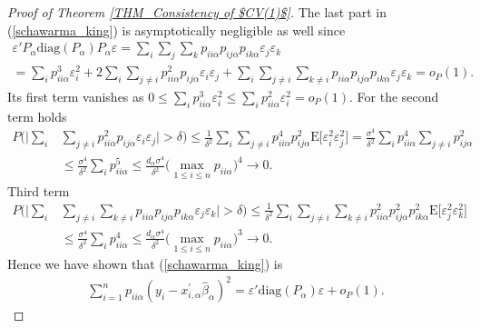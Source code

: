 \documentclass[Research_Module_ES.tex]{subfiles}
\begin{document}
\begin{proof}[Proof of Theorem \ref{THM_Consistency of $CV(1)$}]
	The last part in (\ref{schawarma_king}) is asymptotically negligible as well since
	\begin{align*}
	\varepsilon'P_\alpha\mathrm{diag}(P_\alpha)P_\alpha \varepsilon = \sum_i\sum_j\sum_k p_{ii\alpha}p_{ij\alpha}p_{ik\alpha}\varepsilon_j\varepsilon_k\\
	=\sum_i p_{ii\alpha}^3 \varepsilon_i^2 +2\sum_i\sum_{j\neq i}p_{ii\alpha}^2p_{ij\alpha}\varepsilon_i\varepsilon_j + 
	\sum_i\sum_{j\neq i}\sum_{k\neq i}p_{ii\alpha}p_{ij\alpha}p_{ik\alpha}\varepsilon_j\varepsilon_k=o_P(1).
	\end{align*}
	Its first term vanishes as $0\le \sum_i p_{ii\alpha}^3 \varepsilon_i^2 \le \sum_i p_{ii\alpha}^2 \varepsilon_i^2 = o_P(1)$.
	For the second term holds
	\begin{align*}
	P\biggl(\biggl|\sum_{i}&\sum_{j\neq i}p_{ii\alpha}^2p_{ij\alpha}\varepsilon_i\varepsilon_j\biggr|>\delta\biggr)\le\frac{1}{\delta^2}\sum_{i}\sum_{j\neq i}p_{ii\alpha}^4p_{ij\alpha}^2\mathrm{E}\bigl[\varepsilon_i^2\varepsilon_j^2\bigr]
	= \frac{\sigma^4}{\delta^2}\sum_{i}p_{ii\alpha}^4\sum_{j\neq i}p_{ij\alpha}^2\\
	&\le \frac{\sigma^4}{\delta^2}\sum_{i}p_{ii\alpha}^5 \le \frac{d_\alpha\sigma^4}{\delta^2}\biggl(\max_{1\le i\le n}p_{ii\alpha}\biggr)^4 \to 0.
	\end{align*}
	Third term
	\begin{align*}
	P\biggl(\biggl|\sum_i&\sum_{j\neq i}\sum_{k\neq i}p_{ii\alpha}p_{ij\alpha}p_{ik\alpha}\varepsilon_j\varepsilon_k\biggr|>\delta\biggr)\le\frac{1}{\delta^2}\sum_i\sum_{j\neq i}\sum_{k\neq i}p_{ii\alpha}^2p_{ij\alpha}^2p_{ik\alpha}^2\mathrm{E}\bigl[\varepsilon_j^2\varepsilon_k^2\bigr]\\
	&\le \frac{\sigma^4}{\delta^2} \sum_i p_{ii\alpha}^4 \le \frac{d_\alpha\sigma^4}{\delta^2}\biggl(\max_{1\le i\le n}p_{ii\alpha}\biggr)^3 \to 0.
	\end{align*}
	Hence we have shown that (\ref{schawarma_king}) is 
	\begin{align*}
	\sum_{i=1}^n p_{ii\alpha}(y_i-x_{i,\alpha}^\prime\hat{\beta}_\alpha)^2 = \varepsilon'\mathrm{diag}(P_\alpha)\varepsilon + o_P(1).
	\end{align*}
	

\end{proof}
\end{document}
